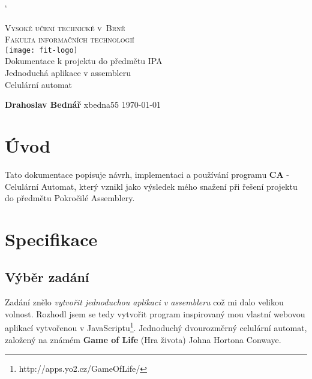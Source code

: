\documentclass[11pt,a4paper,titlepage]{article}
\begin{document}
\catcode`

\begin{titlepage}
\begin{center}
\Huge
\textsc{Vysoké učení technické v~Brně\\
\huge Fakulta informačních technologií}\\ 
\texttt{[image: fit-logo]}\\
\huge Dokumentace k projektu do předmětu IPA\\
\Huge Jednoduchá aplikace v assembleru\\
\Large Celulární automat
\end{center}


{\bf \large Drahoslav Bednář} {\large xbedna55} {\large \hfill \today}

\thispagestyle{empty}
\setcounter{page}{0}
\end{titlepage}

\newpage
\thispagestyle{empty}
\setcounter{page}{0}
\tableofcontents

\newpage
\section{Úvod}
Tato dokumentace popisuje návrh, implementaci a používání programu {\bf CA} - Celulární Automat, který vznikl jako výsledek mého snažení při řešení projektu do předmětu Pokročilé Assemblery.

\newpage
\section{Specifikace}
\subsection{Výběr zadání}
Zadání znělo {\it  vytvořit jednoduchou aplikaci v assembleru} což mi dalo velikou volnost. Rozhodl jsem se tedy vytvořit program inspirovaný mou vlastní webovou aplikací vytvořenou v JavaScriptu\footnote{http://apps.yo2.cz/GameOfLife/}. Jednoduchý dvourozměrný celulární automat, založený na známém {\bf Game of Life} (Hra života) Johna Hortona Conwaye.
\end{document}
